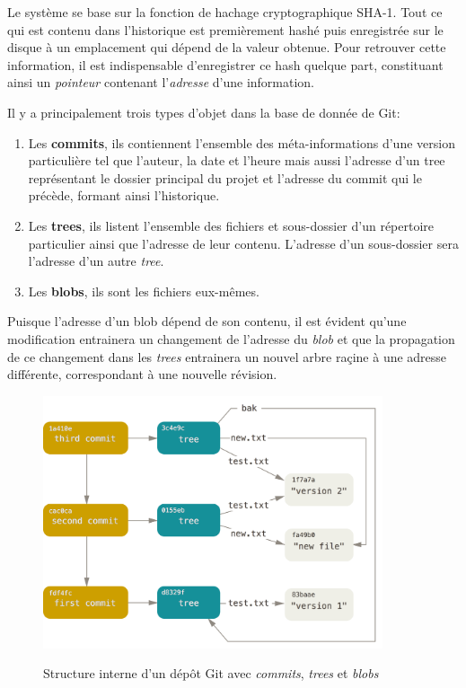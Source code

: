 \documentclass[11pt,a4paper]{article}
\begin{document}
Le système se base sur la fonction de hachage cryptographique SHA-1.
Tout ce qui est contenu dans l'historique est premièrement hashé puis enregistrée sur le disque à un emplacement qui dépend de la valeur obtenue.
Pour retrouver cette information, il est indispensable d'enregistrer ce hash quelque part, constituant ainsi un \textit{pointeur} contenant l'\textit{adresse} d'une information.

Il y a principalement trois types d'objet dans la base de donnée de Git:

\begin{enumerate}
	\item Les {\bf commits},
	ils contiennent l'ensemble des méta-informations d'une version particulière tel que l'auteur, la date et l'heure mais aussi l'adresse d'un tree représentant le dossier principal du projet et l'adresse du commit qui le précède, formant ainsi l'historique.
	
	\item Les {\bf trees},
	ils listent l'ensemble des fichiers et sous-dossier d'un répertoire particulier ainsi que l'adresse de leur contenu.
	L'adresse d'un sous-dossier sera l'adresse d'un autre \textit{tree}.
	
	\item Les {\bf blobs},
	ils sont les fichiers eux-mêmes.
\end{enumerate}

Puisque l'adresse d'un blob dépend de son contenu, il est évident qu'une modification entrainera un changement de l'adresse du \textit{blob} et que la propagation de ce changement dans les \textit{trees} entrainera un nouvel arbre raçine à une adresse différente, correspondant à une nouvelle révision.

\begin{figure}[ht]
\begin{center}
\includegraphics[width=10cm]{img_structure} \cite{progit}
\caption{Structure interne d'un dépôt Git avec \textit{commits}, \textit{trees} et \textit{blobs}}
\end{center}
\end{figure}
\end{document}
